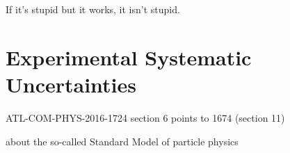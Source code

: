 \begin{savequote}[75mm]
If it's stupid but it works, it isn't stupid.
\end{savequote}

\chapter{Experimental Systematic Uncertainties}
ATL-COM-PHYS-2016-1724 section 6 points to 1674 (section 11)

 about the so-called Standard Model of particle physics


